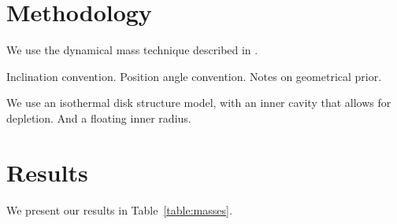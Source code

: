 \documentclass[twocolumn]{aastex6}
\begin{document}



\section{Methodology}

We use the dynamical mass technique described in \citet{czekala15a}.

Inclination convention. Position angle convention. Notes on geometrical prior.

We use an isothermal disk structure model, with an inner cavity that allows for depletion. And a floating inner radius.

\section{Results}

We present our results in Table~\ref{table:masses}.

\end{document}
